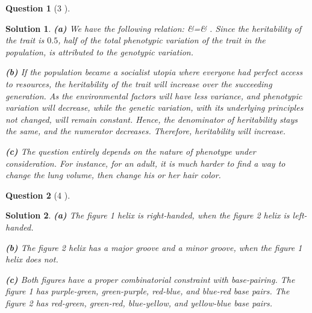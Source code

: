 \documentclass{article} %
\def\eQb#1\eQe{\begin{eqnarray*}#1\end{eqnarray*}}
\theoremstyle{quest}
\newtheorem*{question}{Question}
\newtheorem*{solution}{Solution}
\begin{document}
\begin{question}[3 ]
\end{question}
\begin{solution}

\textbf{(a)} We have the following relation:
\eQb
\text{Heritability} &=& 
{}. 
\eQe
Since the heritability of the trait is $0.5$, 
half of the total phenotypic variation of the trait
in the population, is attributed to the genotypic variation. 

\smallskip

\textbf{(b)} If the population became a socialist utopia where 
everyone had perfect access to resources, the heritability of the 
trait will increase over the succeeding generation. As the environmental
factors will have less variance, and phenotypic variation will decrease,
while the genetic variation, with its
underlying principles not changed, will remain constant. Hence, the
denominator of heritability stays the same, and the numerator decreases.
Therefore, heritability will increase.
 

\smallskip

\textbf{(c)} The question entirely depends on the nature of
phenotype under consideration. For instance, for an adult,
it is much harder to find a way to change the lung volume,
then change his or her hair color. 

\end{solution}

\bigskip

\begin{question}[4 ]
\end{question}
\begin{solution}
\textbf{(a)} 
The figure 1 helix is right-handed, when the figure 2 helix is left-handed.

\smallskip

\textbf{(b)} The figure 2 helix has a major groove and a minor groove,
when the figure 1 helix does not.

\smallskip

\textbf{(c)} Both figures have a proper 
combinatorial constraint with base-pairing.
The figure 1 has purple-green, green-purple, red-blue, and blue-red base
pairs.
The figure 2 has red-green, green-red, blue-yellow, and yellow-blue 
base pairs.



\end{solution}
\end{document}
